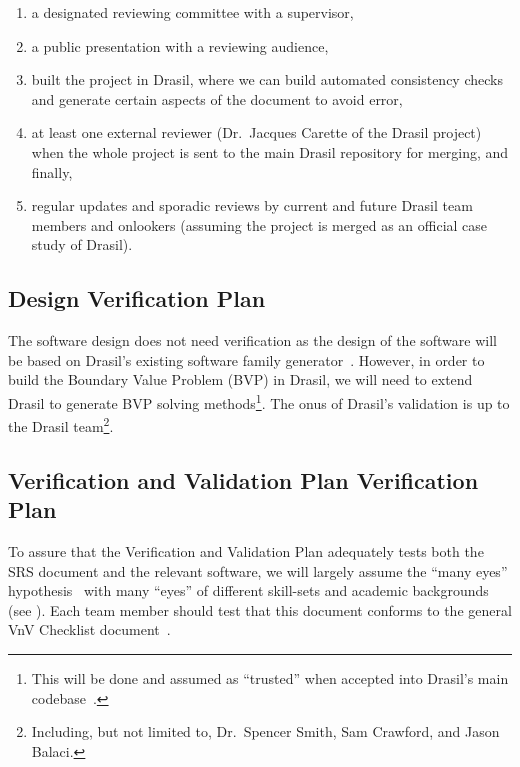 \documentclass[12pt, titlepage]{article}
\begin{document}
\begin{enumerate}

    \item a designated reviewing committee with a supervisor,

    \item a public presentation with a reviewing audience,

    \item built the project in Drasil, where we can build automated consistency
          checks and generate certain aspects of the document to avoid error,

    \item at least one external reviewer (Dr.\ Jacques Carette of the Drasil
          project) when the whole \progname{} project is sent to the main Drasil
          repository for merging, and finally,

    \item regular updates and sporadic reviews by current and future Drasil team
          members and onlookers (assuming the project is merged as an official
          case study of Drasil).

\end{enumerate}

\subsection{Design Verification Plan}

The software design does not need verification as the design of the software
will be based on Drasil's existing software family generator~\cite{Drasil2023}.
However, in order to build the Boundary Value Problem (BVP) in Drasil, we will
need to extend Drasil to generate BVP solving methods\footnote{This will be done
    and assumed as ``trusted'' when accepted into Drasil's main
    codebase~\cite{Drasil2023}.}. The onus of Drasil's validation is up to the
Drasil team\footnote{Including, but not limited to, Dr.\ Spencer Smith, Sam
    Crawford, and Jason Balaci.}.

\subsection{Verification and Validation Plan Verification Plan}

To assure that the Verification and Validation Plan adequately tests both the
SRS document and the relevant software, we will largely assume the ``many eyes''
hypothesis~\cite{Caraco1980avian} with many ``eyes'' of different skill-sets and
academic backgrounds (see ). Each team member should
test that this document conforms to the general VnV Checklist
document~\cite{SmithCapTemplate}.
\end{document}
